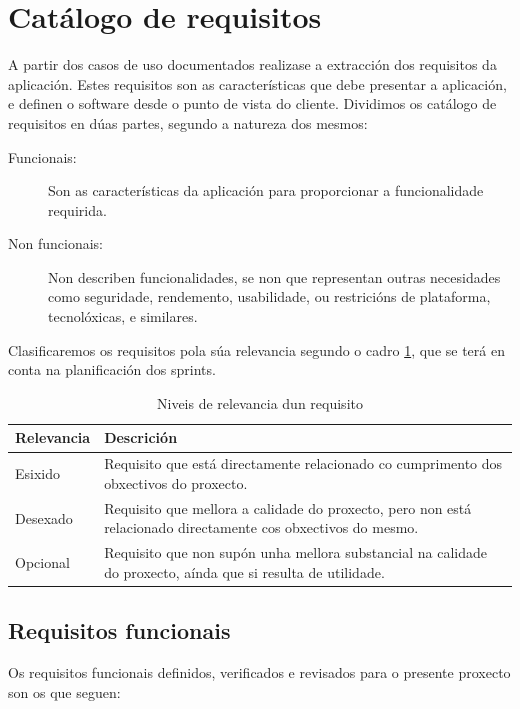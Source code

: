 \section{Catálogo de requisitos}
A partir dos casos de uso documentados realizase a extracción dos requisitos da aplicación. Estes requisitos son as características que debe presentar a aplicación, e definen o software desde o punto de vista do cliente. Dividimos os catálogo de requisitos en dúas partes, segundo a natureza dos mesmos:
\begin{description}
\item[Funcionais:] Son as características da aplicación para proporcionar a funcionalidade requirida.
\item[Non funcionais:] Non describen funcionalidades, se non que representan outras necesidades como seguridade, rendemento, usabilidade, ou restricións de plataforma, tecnolóxicas, e similares.
\end{description}

Clasificaremos os requisitos pola súa relevancia segundo o cadro \ref{tab:relevanciaReq}, que se terá en conta na planificación dos sprints.
\begin{table}
\begin{tabularx}{\textwidth}{lX} \toprule
	Relevancia & Descrición \\
	\midrule
	Esixido & Requisito que está directamente relacionado co cumprimento dos obxectivos do proxecto.\\
	Desexado & Requisito que mellora a calidade do proxecto, pero non está relacionado directamente cos obxectivos do mesmo.\\
	Opcional &  Requisito que non supón unha mellora substancial na calidade do proxecto, aínda que si resulta de utilidade.\\
	\bottomrule
\end{tabularx}
\caption{Niveis de relevancia dun requisito}
\label{tab:relevanciaReq}
\end{table}

\subsection{Requisitos funcionais}
Os requisitos funcionais definidos, verificados e revisados para o presente proxecto son os que seguen:

		  	{}%
			{}%
			{}%
			
		  	{}%
			{}%
			{}%
			
